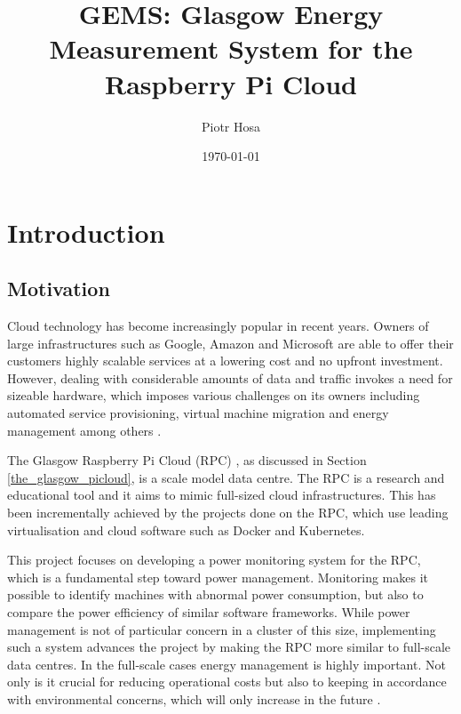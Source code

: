 \documentclass{l4proj}
\begin{document}
\title{GEMS: Glasgow Energy Measurement System for the Raspberry Pi Cloud}
\author{Piotr Hosa}
\date{\today}
\maketitle

\begin{abstract}

\end{abstract}

\renewcommand{\abstractname}{Acknowledgements}
\begin{abstract}

\end{abstract}

\educationalconsent
%
%
\tableofcontents

\chapter{Introduction}

\section{Motivation}
Cloud technology has become increasingly popular in recent years. Owners of large infrastructures such as Google, Amazon and Microsoft are able to offer their customers highly scalable services at a lowering cost and no upfront investment. However, dealing with considerable amounts of data and traffic invokes a need for sizeable hardware, which imposes various challenges on its owners including automated service provisioning, virtual machine migration and energy management among others \cite{zhang_cheng_boutaba_2010}.

\noindent
The Glasgow Raspberry Pi Cloud (RPC) \cite{tso_white_jouet_singer_pezaros_2013}, as discussed in Section \ref{the_glasgow_picloud}, is a scale model data centre. The RPC is a research and educational tool and it aims to mimic full-sized cloud infrastructures. This has been incrementally achieved by the projects done on the RPC, which use leading virtualisation and cloud software such as Docker and Kubernetes.

\noindent
This project focuses on developing a power monitoring system for the RPC, which is a fundamental step toward power management. Monitoring makes it possible to identify machines with abnormal power consumption, but also to compare the power efficiency of similar software frameworks. While power management is not of particular concern in a cluster of this size, implementing such a system advances the project by making the RPC more similar to full-scale data centres. In the full-scale cases energy management is highly important. Not only is it crucial for reducing operational costs but also to keeping in accordance with environmental concerns, which will only increase in the future \cite{dabbagh_hamdaoui_guizani_rayes_2015}.
\end{document}

